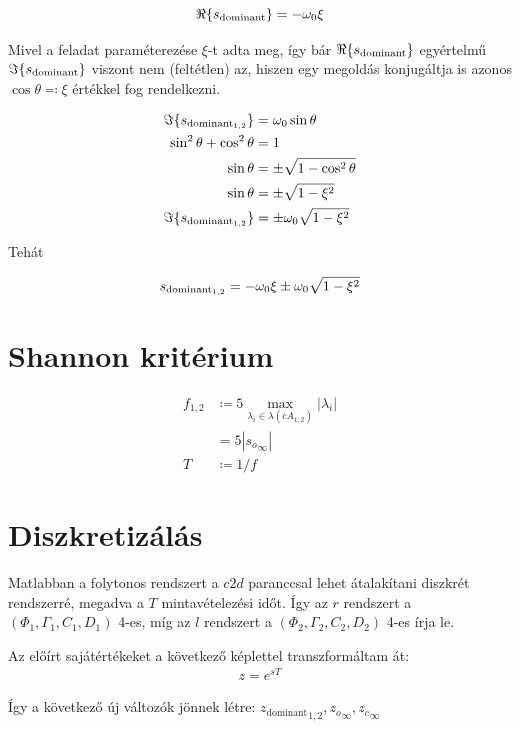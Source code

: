 \documentclass{article}
\begin{document}
	\begin{equation}
		\Re\{s_{\textrm{dominant}}\} = -\omega_0\xi
	\end{equation}

	Mivel a feladat paraméterezése $\xi$-t adta meg, így bár $\Re\{s_{\textrm{dominant}}\}$ egyértelmű $\Im\{s_{\textrm{dominant}}\}$ viszont nem (feltétlen) az, hiszen egy megoldás konjugáltja is azonos $\cos{\theta} \eqqcolon \xi$ értékkel fog rendelkezni.
	
	\begin{align}
		\Im\{s_{\textrm{dominant}_{1,2}}\} & = \omega_0\sin{\theta} \\
		\sin^2{\theta} + \cos^2{\theta} & = 1 \\
		\sin{\theta} & = \pm \sqrt{1 - \cos^2{\theta}} \\
		\sin{\theta} & = \pm \sqrt{1 - \xi^2} \\
		\Im\{s_{\textrm{dominant}_{1,2}}\} & = \pm \omega_0 \sqrt{1 - \xi^2}
	\end{align}

	Tehát

	\begin{align}
		s_{\textrm{dominant}_{1,2}} = -\omega_0\xi \pm \omega_0 \sqrt{1 - \xi^2}
	\end{align}
\section{Shannon kritérium}
    \newcommand{\soinf}{{s_o}_{\infty}}
    \newcommand{\scinf}{{s_c}_{\infty}}

	\begin{align}
		f_{1,2} & \coloneqq 5 \max_{ \lambda_i \in \lambda(cA_{1,2}) } | \lambda_i | \\
		& =
		5 |\soinf| \\
		T & \coloneqq 1/f
	\end{align}

\section{Diszkretizálás}
	Matlabban a folytonos rendszert a $c2d$ paranccsal lehet átalakítani diszkrét rendszerré, megadva a $T$ mintavételezési időt. Így az $r$ rendszert a $(\Phi_1, \Gamma_1, C_1, D_1)$ 4-es, míg az $l$ rendszert a $(\Phi_2, \Gamma_2, C_2, D_2)$ 4-es írja le.

	Az előírt sajátértékeket a következő képlettel transzformáltam át:
	\begin{align}
		z = e^{s T}
	\end{align}

    \newcommand{\zoinf}{ {{z_o}_{\infty}} }
    \newcommand{\zcinf}{ {{z_c}_{\infty}} }
	\newcommand{\zdom}{ {z_{\textrm{dominant}}} }
    Így a következő új változók jönnek létre: $\zdom_{1,2}, \zoinf, \zcinf$
\end{document}
